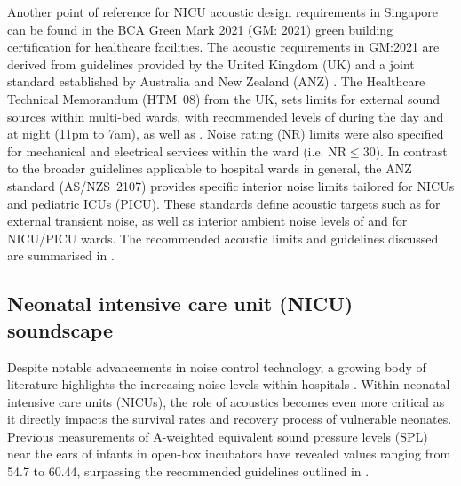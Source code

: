 Another point of reference for NICU acoustic design requirements in Singapore can be found in the BCA Green Mark 2021 (GM: 2021) green building certification for healthcare facilities. The acoustic requirements in GM:2021 are derived from guidelines provided by the United Kingdom (UK) \citep{HTM0801_2013} and a joint standard established by Australia and New Zealand (ANZ) \citep{ASNZS2107_2016}. The Healthcare Technical Memorandum (HTM~08) from the UK, sets limits for external sound sources within multi-bed wards, with recommended levels of  during the day and  at night (11pm to 7am), as well as . Noise rating (NR) limits were also specified for mechanical and electrical services within the ward (i.e. $\text{NR}\le30$). In contrast to the broader guidelines applicable to hospital wards in general, the ANZ standard (AS/NZS~2107) provides specific interior noise limits tailored for NICUs and pediatric ICUs (PICU). These standards define acoustic targets such as  for external transient noise, as well as interior ambient noise levels of  and  for NICU/PICU wards. The recommended acoustic limits and guidelines discussed are summarised in .



\iftodo
\subsection{Neonatal intensive care unit (NICU) soundscape}
\begin{itemize}[leftmargin=*]
\end{itemize}
\fi

Despite notable advancements in noise control technology, a growing body of literature highlights the increasing noise levels within hospitals \cite{DeLimaAndrade2021,Busch-Vishniac2019, Busch-Vishniac2023,Lam2022c}. Within neonatal intensive care units (NICUs), the role of acoustics becomes even more critical as it directly impacts the survival rates and recovery process of vulnerable neonates. Previous measurements of A-weighted equivalent sound pressure levels (SPL) near the ears of infants in open-box incubators have revealed values ranging from \num{54.7} to \SI{60.44}{\decibelA}, surpassing the recommended guidelines outlined in . 

